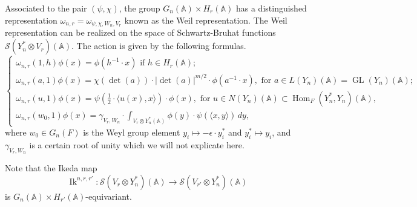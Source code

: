 \documentclass[10pt]{amsart}
\theoremstyle{plain}
\numberwithin{equation}{section}
\begin{document}
Associated to the pair $(\psi, \chi)$,
the group $G_n({\mathbb{A}})\times H_r({\mathbb{A}})$ has a distinguished representation
$\omega_{n,r}  = \omega_{\psi, \chi, W_n, V_r}$ known as the Weil representation.
 The Weil representation can be realized on the space of
 Schwartz-Bruhat functions $\mathcal{S}(Y_n^*\otimes V_r)({\mathbb{A}})$. The
 action is given by the following formulas.
\vskip 5pt
\[
\begin{cases}
\omega_{n,r}(1, h)\phi(x)  = \phi(h^{-1} \cdot x)  \text{  if $h \in H_r({\mathbb{A}})$;} \\
\omega_{n,r}(a,1) \phi(x)  =  \chi(\det(a)) \cdot |\det (a)|^{m/2}
\cdot \phi( a^{-1} \cdot x),  \text{  for $a \in L(Y_n)({\mathbb{A}}) =
  {\operatorname{GL}}(Y_n)({\mathbb{A}})$;} \\
\omega_{n,r}(u,1) \phi(x)  = \psi(\frac{1}{2} \cdot  \langle  u(x),
x\rangle)\cdot \phi(x),  \text{  for $u \in N(Y_n)({\mathbb{A}})  \subset
  {\operatorname{Hom}}_F(Y_n^*, Y_n)({\mathbb{A}})$,} \\
\omega_{n,r}(w_0, 1)\phi(x)=  \gamma_{V_r, W_n} \cdot  \int_{V_r \otimes Y_n^*({\mathbb{A}})} \phi(y)
\cdot \psi( \langle x,y\rangle) \, dy,
  \end{cases} \]
 where $w_0\in G_n(F)$ is the Weyl group element $y_i \mapsto - \epsilon \cdot y_i^*$
 and $y_i^* \mapsto y_i$, and $ \gamma_{V_r, W_n}$ is a certain root of unity which we will not explicate here.

\vskip 15pt

Note that the Ikeda map 
\[  {\operatorname{Ik}}^{n,r,r'}: \mathcal{S}(V_r \otimes Y_n^*)({\mathbb{A}}) \longrightarrow
\mathcal{S}(V_{r'} \otimes Y_n^*)({\mathbb{A}}) \]
is $G_n({\mathbb{A}})\times H_{r'}({\mathbb{A}})$-equivariant. 

\vskip 5pt
\end{document}
